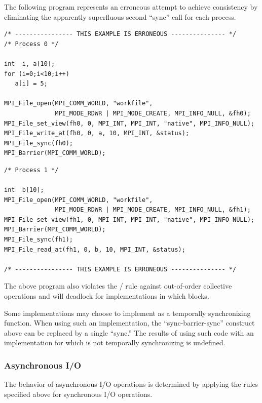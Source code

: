 \begin{example}
\label{io-erroneousconsistency}
The following program represents an erroneous attempt to achieve consistency
by eliminating the apparently superfluous second ``sync'' call for
each process.
\begin{lstlisting}[language={[MPI]C}]
/* ---------------- THIS EXAMPLE IS ERRONEOUS --------------- */
/* Process 0 */

int  i, a[10];
for (i=0;i<10;i++)
   a[i] = 5;

MPI_File_open(MPI_COMM_WORLD, "workfile",
              MPI_MODE_RDWR | MPI_MODE_CREATE, MPI_INFO_NULL, &fh0);
MPI_File_set_view(fh0, 0, MPI_INT, MPI_INT, "native", MPI_INFO_NULL);
MPI_File_write_at(fh0, 0, a, 10, MPI_INT, &status);
MPI_File_sync(fh0);
MPI_Barrier(MPI_COMM_WORLD);
\end{lstlisting}

\begin{lstlisting}[language={[MPI]C}]
/* Process 1 */

int  b[10];
MPI_File_open(MPI_COMM_WORLD, "workfile",
              MPI_MODE_RDWR | MPI_MODE_CREATE, MPI_INFO_NULL, &fh1);
MPI_File_set_view(fh1, 0, MPI_INT, MPI_INT, "native", MPI_INFO_NULL);
MPI_Barrier(MPI_COMM_WORLD);
MPI_File_sync(fh1);
MPI_File_read_at(fh1, 0, b, 10, MPI_INT, &status);

/* ---------------- THIS EXAMPLE IS ERRONEOUS --------------- */
\end{lstlisting}
The above program also violates the \MPI/ rule
against out-of-order collective operations
and
will deadlock for implementations in which  blocks.
\end{example}

\begin{users}
Some implementations may choose to implement 
as a temporally synchronizing function.  When using such an
implementation, the ``sync-barrier-sync'' construct above can
be replaced by a single ``sync.''  The results of using such
code with an implementation for which  is not
temporally synchronizing is undefined.
\end{users}


\subsubsection{Asynchronous I/O}
The behavior of asynchronous I/O operations is determined by
applying the rules specified above for synchronous I/O operations.

